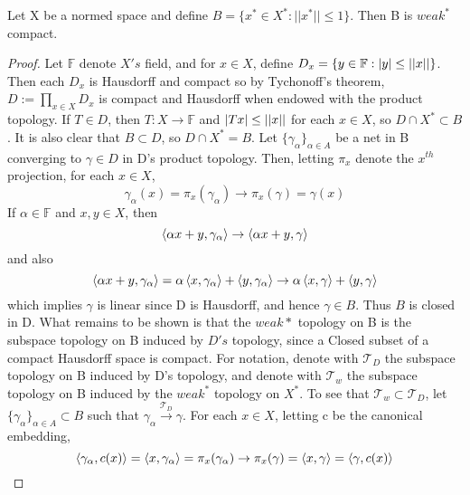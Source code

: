 \begin{thm}
    \label{thm:banachalaoglu}
    Let X be a normed space and define $B=\{x^* \in X^*: ||x^*|| \leq 1\}$. Then B is $weak^*$ compact. 
    \begin{proof}
        Let $\mathbb{F}$ denote $X's$ field, and for $x \in X$, define $D_x=\{y \in \mathbb{F}: \left| y \right| \leq \left|\left| x \right|\right|\}$. 
        Then each $D_x$ is Hausdorff and compact so by Tychonoff's theorem, $D:=\prod_{x \in X} D_x$ is compact and Hausdorff when endowed with the product topology. 
        If $T \in D$, then $T:X \to \mathbb{F}$ and $\left| Tx \right| \leq \left|\left| x \right|\right|$ for each $x \in X$, so $D \cap X^* \subset B$. 
        It is also clear that $B \subset D$, so $D \cap X^* = B$. 
        Let $\{\gamma_\alpha\}_{\alpha \in A}$ be a net in B converging to $\gamma \in D$ in D's product topology. 
        Then, letting $\pi_x$ denote the $x^{th}$ projection, for each $x \in X$, 
        \begin{equation}
            \gamma_{\alpha}(x) = \pi_x(\gamma_\alpha) \to \pi_x(\gamma) = \gamma(x)
        \end{equation}
        If $\alpha \in \mathbb{F}$ and $x,y \in X$, then 
        \begin{equation}
            \left\langle \alpha x+y, \gamma_\alpha \right\rangle \to \left\langle  \alpha x+y, \gamma \right\rangle
        \end{equation}
        and also
        \begin{equation}
            \left\langle \alpha x+y,\gamma_\alpha \right\rangle = \alpha \left\langle x,\gamma_\alpha \right\rangle+ \left\langle y,\gamma_\alpha \right\rangle \to \alpha \left\langle x,\gamma \right\rangle+\left\langle y,\gamma \right\rangle
        \end{equation}
        which implies $\gamma$ is linear since D is Hausdorff, and hence $\gamma \in B$. 
        Thus $B$ is closed in D. What remains to be shown is that the $weak*$ topology on B is the subspace topology on B induced by $D's$ topology, since a Closed subset of a compact Hausdorff space is compact. 
        For notation, denote with $\mathcal{T}_D$ the subspace topology on B induced by D's topology, and denote with $\mathcal{T}_w$ the subspace topology on B induced by the  $weak^*$ topology on $X^*$. 
        To see that $\mathcal{T}_w \subset \mathcal{T}_D$, let $\{\gamma_\alpha\}_{\alpha \in A} \subset B$ such that $\gamma_\alpha \overset{\mathcal{T}_D}{\to} \gamma$. For each $x \in X$, letting c be the canonical embedding, 
        \begin{equation}
            \ip{\gamma_{\alpha}, c(x)}= \ip{x,\gamma_\alpha} = \pi_x(\gamma_\alpha) \to \pi_x(\gamma) = \ip{x,\gamma} = \ip{\gamma, c(x)}

\end{equation}
\end{proof}
\end{thm}
